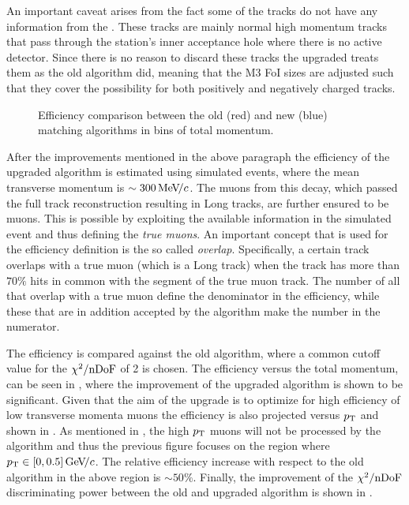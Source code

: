 An important caveat arises from the fact some of the \veloTTracks tracks do not have any information from
the \ttracker. These tracks are mainly normal high momentum tracks that pass through the \ttracker station's inner
acceptance hole where there is no active detector. Since there is no reason to discard these tracks the upgraded
\mvTTm treats them as the old \mvm algorithm did, meaning that the M3 FoI sizes are adjusted such that they cover
the possibility for both positively and negatively charged tracks.

\begin{figure}[t]
  \centering
    \scalebox{.6}{}
  \caption{Efficiency comparison between the old (red) and new (blue) matching algorithms in bins of total momentum.}
 \label{mvm_eff_p_comp}
\end{figure}

After the improvements mentioned in the above paragraph the efficiency of the upgraded \mvTTm algorithm
is estimated using simulated \Sigmapmumu events, where the mean transverse momentum is $\sim 300{\mathrm{\,Me\kern -0.1em V\!/}c}$.
The muons from this decay, which passed the full track reconstruction resulting in Long tracks, 
are further ensured to be muons. This is possible by exploiting the available information in the 
simulated event and thus defining the {\it true muons}. 
An important concept that is used for the \mvTTm efficiency definition is the so called {\it overlap}.
Specifically, a certain \velo track overlaps with a true muon (which is a Long track) 
when the \velo track has more than $70\%$ \velo hits in common with the \velo segment 
of the true muon track. The number of all \veloTTracks that overlap with a true muon define the 
denominator in the \mvTTm efficiency, while these \veloTTracks that are in addition accepted by 
the \mvTTm algorithm make the number in the numerator. 

The efficiency is compared against the old 
\mvm algorithm, where a common cutoff value for the $\chi^2/\rm nDoF$ of 2 is chosen. The efficiency 
versus the total momentum, can be seen in , where the improvement of the 
upgraded \mvTTm algorithm is shown to be significant.  Given that the aim of the \mvTTm upgrade 
is to optimize for high efficiency of low transverse momenta muons the efficiency is also projected 
versus $\mbox{$p_{\rm T}$}$ and shown in . As mentioned in , the 
high $\mbox{$p_{\rm T}$}$ muons will not be processed by the \mvTTm algorithm and thus the previous figure focuses on 
the region where $\mbox{$p_{\rm T}$}\in[0,0.5]{\mathrm{\,Ge\kern -0.1em V\!/}c}$. The relative efficiency increase with respect to the old 
\mvm algorithm in the above region is $\sim 50\%$. Finally, the improvement of the $\chi^2/\rm nDoF$ 
discriminating power between the old and upgraded algorithm is shown in .

